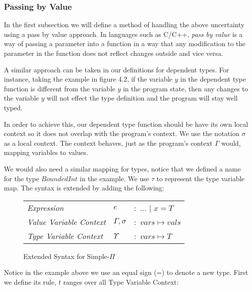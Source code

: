 \documentclass[a4paper,12pt]{report}
\begin{document}
\subsubsection{Passing by Value}
In the first subsection we will define a method of handling the above 
uncertainty using a pass by value approach. In languages such as C/C++, 
\textit{pass by value} \cite{pbv} is a way of passing a parameter into a 
function in a way that any modification to the parameter in the function does 
not reflect changes outside and vice versa. 

\par
A similar approach can be taken in our definitions for dependent types. For 
instance, taking the example in figure 4.2, if the variable $y$ in the dependent 
type function is different from the variable $y$ in the program state, then any 
changes to the variable $y$ will not effect the type definition and the program 
will stay well typed. 

\par
In order to achieve this, our dependent type function should be have its own 
local context so it does not overlap with the program's context. We use the 
notation $\sigma$ as a local context. The context behaves, just as the program's 
context $\Gamma$ would, mapping variables to values.

\par
We would also need a similar mapping for types, notice that we defined a name 
for the type $BoundedInt$ in the example. We use $\tau$ to represent the type 
variable map. The syntax is extended by adding the following: 

\begin{figure}[H]
  \begin{center}
    \begin{tabular} {l l l}
      \textit{Expression} & $e$ & $:$ ... $|$ $x = T$ \\
      \textit{Value Variable Context} & $\Gamma, \sigma$& $:$ $vars \mapsto 
      vals$ \\
      \textit{Type Variable Context} & $\Upsilon$& $:$ $vars \mapsto T$ \\
    \end{tabular}
  \end{center}
  \caption{Extended Syntax for Simple-$\Pi$}
\end{figure}

\par
Notice in the example above we use an equal sign (=) to denote a new type. 
First we define its rule, $t$ ranges over all Type Variable Context:
\end{document}
